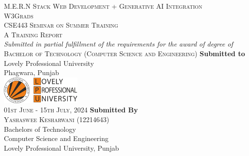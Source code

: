 \begin{titlepage}
    \centering
    \large
    \textsc{M.E.R.N Stack
    Web Development + Generative AI Integration}\\
    \small
    \textsc{W3Grads}\\
    \vspace{0.35cm}
    \huge
    \textsc{CSE443 Seminar on Summer Training}\\
    \vspace{0.5cm}
    \LARGE
    \textsc{A Training Report}\\
    \vspace{1.5cm}
    \large
    \textit{Submitted in partial fulfillment of the requirements for the award of degree of}\\
    \textsc{Bachelor of Technology (Computer Science and Engineering)}
    \vfill
    \large
    \textbf{Submitted to}\\
     Lovely Professional University\\
     Phagwara, Punjab\\
    \vspace{1.5cm}
    \includegraphics[width=0.3\textwidth]{cover/lpu.png}\\
    \vspace{1.5cm}
    \textsc{01st June - 15th July, 2024}
    \vfill
    \small
    \textbf{Submitted By}\\
    \textsc{Yashaswee Kesharwani (12214643)}\\
    Bachelors of Technology\\
    Computer Science and Engineering\\
    Lovely Professional University, Punjab
    \vspace{0.5cm}
\end{titlepage}